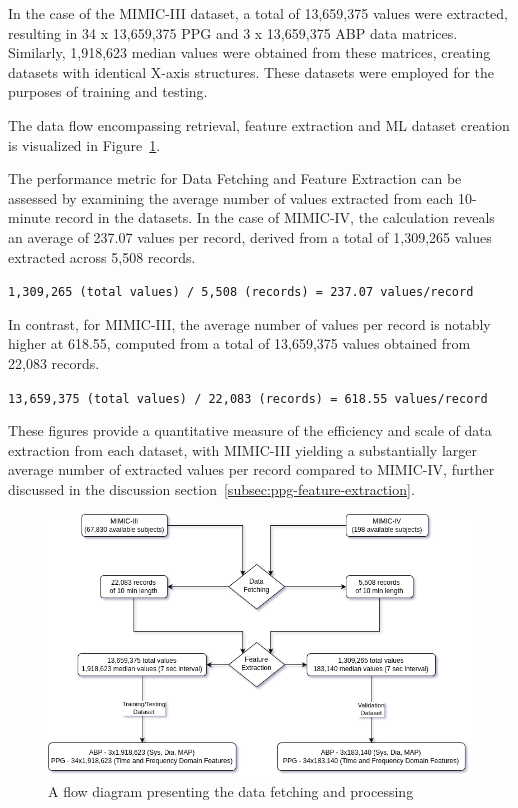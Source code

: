 In the case of the MIMIC-III dataset, a total of 13,659,375 values were extracted, resulting in 34 x 13,659,375 PPG and 3 x 13,659,375 ABP data matrices.
Similarly, 1,918,623 median values were obtained from these matrices, creating datasets with identical X-axis structures.
These datasets were employed for the purposes of training and testing.

The data flow encompassing retrieval, feature extraction and ML dataset creation is visualized in Figure~\ref{fig:data_flow}.

The performance metric for Data Fetching and Feature Extraction can be assessed by examining the average number of values extracted from each 10-minute record in the datasets.
In the case of MIMIC-IV, the calculation reveals an average of 237.07 values per record, derived from a total of 1,309,265 values extracted across 5,508 records.

\vspace{0.3cm}
\texttt{1,309,265 (total values) / 5,508 (records) = 237.07 values/record}
\vspace{0.3cm}

In contrast, for MIMIC-III, the average number of values per record is notably higher at 618.55, computed from a total of 13,659,375 values obtained from 22,083 records.

\vspace{0.3cm}
\texttt{13,659,375 (total values) / 22,083 (records) = 618.55 values/record}
\vspace{0.3cm}

These figures provide a quantitative measure of the efficiency and scale of data extraction from each dataset, with MIMIC-III yielding a substantially larger average number of extracted values per record
compared to MIMIC-IV, further discussed in the discussion section~\ref{subsec:ppg-feature-extraction}.

\vspace{1cm}
\begin{figure}[h]
    \centering
    \includegraphics[width=\textwidth]{images/results/flow_diagram}
    \caption{A flow diagram presenting the data fetching and processing}
    \label{fig:data_flow}
\end{figure}

